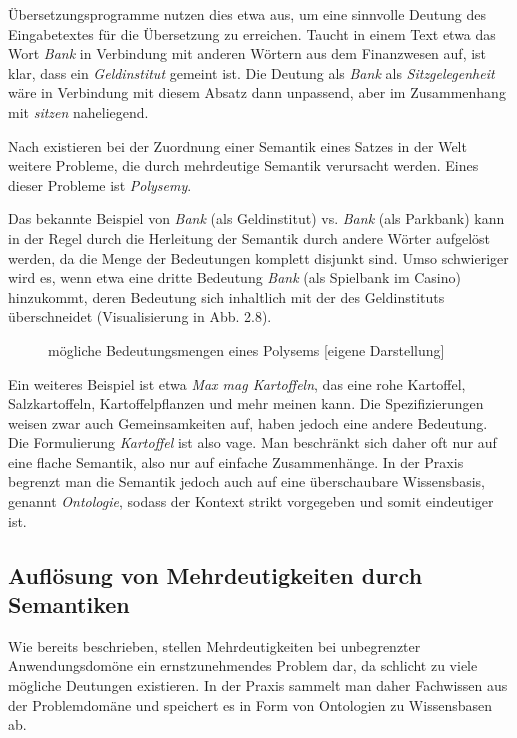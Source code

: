 \documentclass[12pt]{report}
\begin{document}
Übersetzungsprogramme nutzen dies etwa aus, um eine sinnvolle Deutung des Eingabetextes für die Übersetzung zu erreichen. Taucht in einem Text etwa das Wort \textit{Bank} in Verbindung mit anderen Wörtern aus dem Finanzwesen auf, ist klar, dass ein \textit{Geldinstitut} gemeint ist. Die Deutung als \textit{Bank} als \textit{Sitzgelegenheit} wäre in Verbindung mit diesem Absatz dann unpassend, aber im Zusammenhang mit \textit{sitzen} naheliegend. 

Nach \cite{car52} existieren bei der Zuordnung einer Semantik eines Satzes in der Welt weitere Probleme, die durch mehrdeutige Semantik verursacht werden. Eines dieser Probleme ist \textit{Polysemy}. 

Das bekannte Beispiel von \textit{Bank} (als Geldinstitut) vs. \textit{Bank} (als Parkbank) kann in der Regel durch die Herleitung der Semantik durch andere Wörter aufgelöst werden, da die Menge der Bedeutungen komplett disjunkt sind. Umso schwieriger wird es, wenn etwa eine dritte Bedeutung \textit{Bank} (als Spielbank im Casino) hinzukommt, deren Bedeutung sich inhaltlich mit der des Geldinstituts überschneidet (Visualisierung in Abb. 2.8). 

\begin{figure}[h!]
\caption{mögliche Bedeutungsmengen eines Polysems [eigene Darstellung]}
\end{figure}

Ein weiteres Beispiel ist etwa \textit{\glqq  Max mag Kartoffeln\grqq{}}, das eine rohe Kartoffel, Salzkartoffeln, Kartoffelpflanzen und mehr meinen kann. Die Spezifizierungen weisen zwar auch Gemeinsamkeiten auf, haben jedoch eine andere Bedeutung. Die Formulierung \textit{Kartoffel} ist also vage.
Man beschränkt sich daher oft nur auf eine flache Semantik, also nur auf einfache Zusammenhänge. In der Praxis begrenzt man die Semantik jedoch auch auf eine überschaubare Wissensbasis, genannt \textit{\glqq  Ontologie\grqq{}}, sodass der Kontext strikt vorgegeben und somit eindeutiger ist.

\subsection{Auflösung von Mehrdeutigkeiten durch \\Semantiken}
Wie bereits beschrieben, stellen Mehrdeutigkeiten bei unbegrenzter Anwendungsdomöne ein ernstzunehmendes Problem dar, da schlicht zu viele mögliche Deutungen existieren. In der Praxis sammelt man daher Fachwissen aus der Problemdomäne und speichert es in Form von Ontologien zu Wissensbasen ab.
\end{document}
